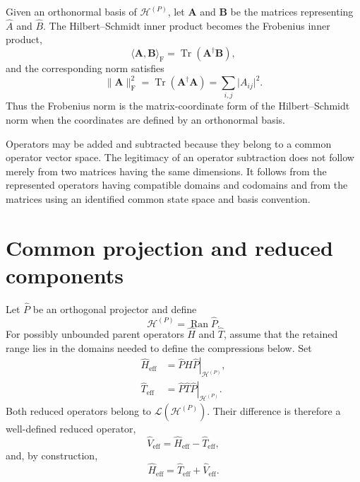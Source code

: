 Given an orthonormal basis of $\mathcal H^{(P)}$, let $\mathbf A$ and
$\mathbf B$ be the matrices representing $\hat A$ and $\hat B$. The
Hilbert--Schmidt inner product becomes the Frobenius inner product,
\begin{equation}
    \langle\mathbf A,\mathbf B\rangle_{\mathrm F}
    =
    \operatorname{Tr}\!\left(\mathbf A^\dagger\mathbf B\right),
\end{equation}
and the corresponding norm satisfies
\begin{equation}
    \lVert\mathbf A\rVert_{\mathrm F}^2
    =
    \operatorname{Tr}\!\left(\mathbf A^\dagger\mathbf A\right)
    =
    \sum_{i,j}\lvert A_{ij}\rvert^2.
\end{equation}
Thus the Frobenius norm is the matrix-coordinate form of the
Hilbert--Schmidt norm when the coordinates are defined by an orthonormal basis.

Operators may be added and subtracted because they belong to a common operator
vector space. The legitimacy of an operator subtraction does not follow merely
from two matrices having the same dimensions. It follows from the represented
operators having compatible domains and codomains and from the matrices using
an identified common state space and basis convention.

\section{Common projection and reduced components}


Let $\hat P$ be an orthogonal projector and define
\begin{equation}
    \mathcal H^{(P)}
    =
    \operatorname{Ran}\hat P.
\end{equation}
For possibly unbounded parent operators $\hat H$ and $\hat T$, assume that the
retained range lies in the domains needed to define the compressions below.
Set
\begin{align}
    \hat H_{\mathrm{eff}}
    &=
    \left.
        \hat P\hat H\hat P
    \right|_{\mathcal H^{(P)}},
    \\
    \hat T_{\mathrm{eff}}
    &=
    \left.
        \hat P\hat T\hat P
    \right|_{\mathcal H^{(P)}}.
\end{align}
Both reduced operators belong to
$\mathcal L\!\left(\mathcal H^{(P)}\right)$. Their difference is therefore a
well-defined reduced operator,
\begin{equation}
    \hat V_{\mathrm{eff}}
    =
    \hat H_{\mathrm{eff}}
    -
    \hat T_{\mathrm{eff}},
\end{equation}
and, by construction,
\begin{equation}
    \hat H_{\mathrm{eff}}
    =
    \hat T_{\mathrm{eff}}
    +
    \hat V_{\mathrm{eff}}.
\end{equation}

